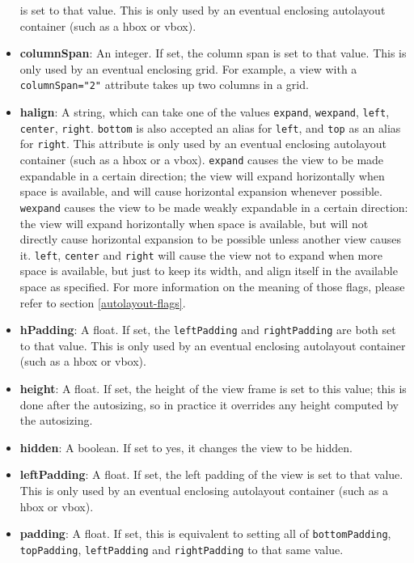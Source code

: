 \begin{itemize}
  is set to that value.  This is only used by an eventual enclosing
  autolayout container (such as a hbox or vbox).
\item {\bf columnSpan}: An integer.  If set, the column span is set to
  that value.  This is only used by an eventual enclosing grid.  For
  example, a view with a \texttt{columnSpan="2"} attribute takes up
  two columns in a grid.
\item {\bf halign}: A string, which can take one of the values
  \texttt{expand}, \texttt{wexpand}, \texttt{left}, \texttt{center},
  \texttt{right}.  \texttt{bottom} is also accepted an alias for
  \texttt{left}, and \texttt{top} as an alias for \texttt{right}.
  This attribute is only used by an eventual enclosing autolayout
  container (such as a hbox or a vbox).  \texttt{expand} causes the
  view to be made expandable in a certain direction; the view will
  expand horizontally when space is available, and will cause
  horizontal expansion whenever possible.  \texttt{wexpand} causes the
  view to be made weakly expandable in a certain direction: the view
  will expand horizontally when space is available, but will not
  directly cause horizontal expansion to be possible unless another
  view causes it.  \texttt{left}, \texttt{center} and \texttt{right}
  will cause the view not to expand when more space is available, but
  just to keep its width, and align itself in the available space as
  specified.  For more information on the meaning of those flags,
  please refer to section \ref{autolayout-flags}.
\item {\bf hPadding}: A float.  If set, the \texttt{leftPadding} and
  \texttt{rightPadding} are both set to that value.  This is only used
  by an eventual enclosing autolayout container (such as a hbox or
  vbox).
\item {\bf height}: A float.  If set, the height of the view frame is
  set to this value; this is done after the autosizing, so in practice
  it overrides any height computed by the autosizing.
\item {\bf hidden}: A boolean.  If set to yes, it changes the view to
  be hidden.
\item {\bf leftPadding}: A float.  If set, the left padding of the
  view is set to that value.  This is only used by an eventual
  enclosing autolayout container (such as a hbox or vbox).
\item {\bf padding}: A float.  If set, this is equivalent to setting
  all of \texttt{bottomPadding}, \texttt{topPadding}, \texttt{leftPadding}
  and \texttt{rightPadding} to that same value.

\end{itemize}
